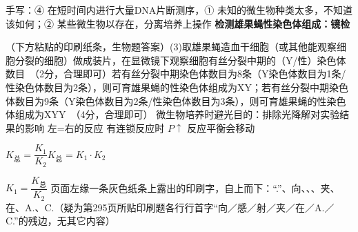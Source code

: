 手写：④ 在短时间内进行大量DNA片断测序，① 未知的微生物种类太多，不知道该如何；② 某些微生物以存在，分离培养上操作
\textbf{检测雄果蝇性染色体组成：镜检}

（下方粘贴的印刷纸条，生物题答案）(3)取雄果蝇造血干细胞（或其他能观察细胞分裂的细胞）做成装片，在显微镜下观察细胞有丝分裂中期的（Y/性）染色体数目\ （2分，合理即可）若有丝分裂中期染色体数目为8条（Y染色体数目为1条/性染色体数目为2条），则可育雄果蝇的性染色体组成为XY；若有丝分裂中期染色体数目为9条（Y染色体数目为2条/性染色体数目为3条），则可育雄果蝇的性染色体组成为XYY\ （4分，合理即可）
微生物培养时避光目的：排除光降解对实验结果的影响
左=右的反应 有连锁反应时 $P\uparrow$ 反应平衡会移动

$K_{\text{总}}=\dfrac{K_1}{K_2}$\qquad $K_{\text{总}}=K_1\cdot K_2$

\hspace{4.2cm}$K_1=\dfrac{K_{\text{总}}}{K_2}$
页面左缘一条灰色纸条上露出的印刷字，自上而下：“.”、向、、、夹、在、A.、C.（疑为第295页所贴印刷题各行行首字“向／感／射／夹／在／A.／C.”的残边，无其它内容）
